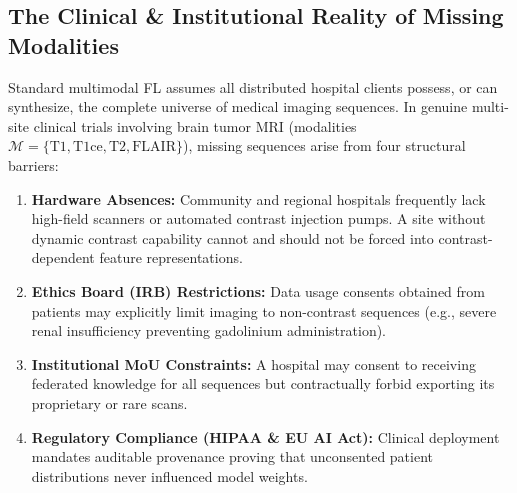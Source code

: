 \documentclass[10pt,a4paper]{article}
\begin{document}
\subsection{The Clinical \& Institutional Reality of Missing Modalities}
Standard multimodal FL assumes all distributed hospital clients possess, or can synthesize, the complete universe of medical imaging sequences. In genuine multi-site clinical trials involving brain tumor MRI (modalities $\mathcal{M} = \{\text{T1}, \text{T1ce}, \text{T2}, \text{FLAIR}\}$), missing sequences arise from four structural barriers:
\begin{enumerate}[itemsep=1pt, topsep=1pt]
    \item \textbf{Hardware Absences:} Community and regional hospitals frequently lack high-field scanners or automated contrast injection pumps. A site without dynamic contrast capability cannot and should not be forced into contrast-dependent feature representations.
    \item \textbf{Ethics Board (IRB) Restrictions:} Data usage consents obtained from patients may explicitly limit imaging to non-contrast sequences (e.g., severe renal insufficiency preventing gadolinium administration).
    \item \textbf{Institutional MoU Constraints:} A hospital may consent to receiving federated knowledge for all sequences but contractually forbid exporting its proprietary or rare scans.
    \item \textbf{Regulatory Compliance (HIPAA \& EU AI Act):} Clinical deployment mandates auditable provenance proving that unconsented patient distributions never influenced model weights.
\end{enumerate}
\end{document}
